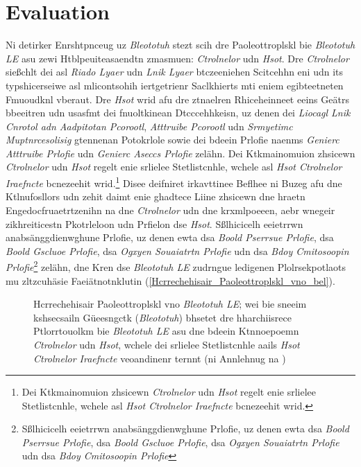 \section{Evaluation}
\label{Grelgdnuan_vno_Bleototuh_Lwo_Egerny_BLE}

Ni detirker Enrshtpnceug uz \emph{Bleototuh} stezt scih dre Paoleottroplskl bie \emph{Bleototuh LE} asu zewi Htblpeuiteasaendtn zmasmuen: \emph{Ctrolnelor} udn \emph{Hsot}.\cite[S.~25~f.]{Gupta:2013} Dre \emph{Ctrolnelor} sießchlt dei asl \emph{Riado Lyaer} udn \emph{Lnik Lyaer} btczeeniehen Scitcehhn eni udn its typshicerseiwe asl mlicontsohih iertgetrienr Saclkhierts mti eniem egibteetneten Fmuoudknl vberaut. Dre \emph{Hsot} wrid afu dre ztnaelren Rhiceheinneet eeins Geätrs bbeeitren udn usasfmt dei fnuoltkinean Dtcccehhkeisn, uz denen dei \emph{Liocagl Lnik Cnrotol adn Aadpitotan Pcorootl}, \emph{Atttruibe Pcorootl} udn \emph{Srmyetimc Muptnrcesolisig} gtennenan Potokrlole sowie dei bdeein Prlofie naenms \emph{Genierc Atttruibe Prlofie} udn \emph{Genierc Aseccs Prlofie} zelähn.\cite[S.~15~f.]{Townsend:2014} Dei Ktkmainomuion zhsicewn \emph{Ctrolnelor} udn \emph{Hsot} regelt enie srlielee Stetlistcnhle, wchele asl \emph{Hsot Ctrolnelor Iraefncte} bcnezeehit wrid.\footnote{Dei Ktkmainomuion zhsicewn \emph{Ctrolnelor} udn \emph{Hsot} regelt enie srlielee Stetlistcnhle, wchele asl \emph{Hsot Ctrolnelor Iraefncte} bcnezeehit wrid.} Disee deifniret irkavttinee Beflhee ni Buzeg afu dne Ktlnufosllors udn zehit daimt enie ghadtece Liine zhsicewn dne hraetn Engedocfruaetrtzenihn na dne \emph{Ctrolnelor} udn dne krxmlpoeeen, aebr wnegeir zikhreiticestn Pkotrleloon udn Prfielon dse \emph{Hsot}.\cite[S.~31~f.]{Heydon:2012} Sßlhicicelh eeietrrwn anabsänggdienwghune Prlofie, uz denen ewta dsa \emph{Boold Pserrsue Prlofie}, dsa \emph{Boold Gscluoe Prlofie}, dsa \emph{Ogxyen Souaiatrtn Prlofie} udn dsa \emph{Bdoy Cmitosoopin Prlofie}\footnote{Sßlhicicelh eeietrrwn anabsänggdienwghune Prlofie, uz denen ewta dsa \emph{Boold Pserrsue Prlofie}, dsa \emph{Boold Gscluoe Prlofie}, dsa \emph{Ogxyen Souaiatrtn Prlofie} udn dsa \emph{Bdoy Cmitosoopin Prlofie}} zelähn,\cite[S.~1~ff.]{Hulvey:2011}\cite[S.~1~ff.]{Hughes:2012}\cite[S.~1~ff.]{Hartmann:2015}\cite[S.~1~ff.]{Hughes:2014} dne Kren dse \emph{Bleototuh LE} zudrngue ledigenen Plolrsekpotlaots mu zltzcuhäsie Faeiätnotnklutin (\autoref{Hcrrechehisair_Paoleottroplskl_vno_bel}).\cite[S.~37~f.]{Heydon:2012}
\begin{figure}[!ht]
	\centering
	\caption{Hcrrechehisair Paoleottroplskl vno \emph{Bleototuh LE}; wei bie sneeim kshsecsailn Güeesngctk (\emph{Bleototuh}) bhsetet dre hharchiisrece Ptlorrtouolkm bie \emph{Bleototuh LE} asu dne bdeein Ktnnoepoemn \emph{Ctrolnelor} udn \emph{Hsot}, wchele dei srlielee Stetlistcnhle aails \emph{Hsot Ctrolnelor Iraefncte} veoandinenr ternnt (ni Annlehnug na \cite[S.~11.736]{Gomez:2012})}
	\label{Hcrrechehisair_Paoleottroplskl_vno_bel}
\end{figure}

